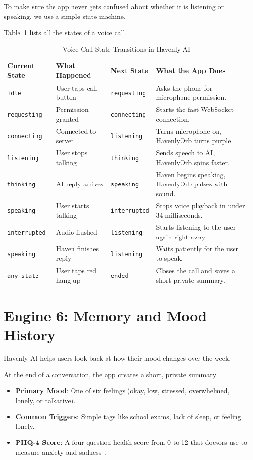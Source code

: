 To make sure the app never gets confused about whether it is listening or speaking, we use a simple state machine.

Table~\ref{tab:fsm_transitions} lists all the states of a voice call.

\begin{table}[ht]
\centering
\caption{Voice Call State Transitions in Havenly AI}
\label{tab:fsm_transitions}
\begin{tabularx}{\textwidth}{lllX}
\toprule
\textbf{Current State} & \textbf{What Happened} & \textbf{Next State} & \textbf{What the App Does} \\
\midrule
\texttt{idle} & User taps call button & \texttt{requesting} & Asks the phone for microphone permission. \\
\texttt{requesting} & Permission granted & \texttt{connecting} & Starts the fast WebSocket connection. \\
\texttt{connecting} & Connected to server & \texttt{listening} & Turns microphone on, HavenlyOrb turns purple. \\
\texttt{listening} & User stops talking & \texttt{thinking} & Sends speech to AI, HavenlyOrb spins faster. \\
\texttt{thinking} & AI reply arrives & \texttt{speaking} & Haven begins speaking, HavenlyOrb pulses with sound. \\
\texttt{speaking} & User starts talking & \texttt{interrupted} & Stops voice playback in under 34 milliseconds. \\
\texttt{interrupted} & Audio flushed & \texttt{listening} & Starts listening to the user again right away. \\
\texttt{speaking} & Haven finishes reply & \texttt{listening} & Waits patiently for the user to speak. \\
\texttt{any state} & User taps red hang up & \texttt{ended} & Closes the call and saves a short private summary. \\
\bottomrule
\end{tabularx}
\end{table}

\section{Engine 6: Memory and Mood History}
\label{sec:arch_engine6}

Havenly AI helps users look back at how their mood changes over the week.

At the end of a conversation, the app creates a short, private summary:
\begin{itemize}
    \item \textbf{Primary Mood}: One of six feelings (okay, low, stressed, overwhelmed, lonely, or talkative).
    \item \textbf{Common Triggers}: Simple tags like school exams, lack of sleep, or feeling lonely.
    \item \textbf{PHQ-4 Score}: A four-question health score from 0 to 12 that doctors use to measure anxiety and sadness~\cite{kroenke2009phq4}.
\end{itemize}

